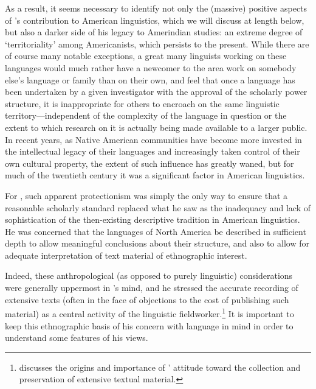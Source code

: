 As a result, it seems necessary to identify not only the (massive)
positive aspects of {\Boas}'s contribution to American linguistics, which
we will discuss at length below, but also a darker side of his legacy
to Amerindian studies: an extreme degree of `territoriality' among
Americanists, which persists to the pre\-sent. While there are of course
many notable exceptions, a great many linguists working on these
languages would much rather have a newcomer to the area work on
somebody else's language or family than on their own, and feel that
once a language has been undertaken by a given investigator with the
approval of the scholarly power structure, it is inappropriate for
others to encroach on the same linguistic territory—independent of the
complexity of the language in question or the extent to which research
on it is actually being made available to a larger public. In recent
years, as Native American communities have become more invested in the
intellectual legacy of their languages and increasingly taken control
of their own cultural property, the extent of such influence has
greatly waned, but for much of the twentieth century it was a
significant factor in American linguistics.

For {\Boas}, such apparent protectionism was simply the only way to
ensure that a reasonable scholarly standard replaced what he saw as
the inadequacy and lack of sophistication of the then-existing
descriptive tradition in American linguistics. He was concerned that
the languages of North America be described in sufficient depth to
allow meaningful conclusions about their structure, and also to allow
for adequate interpretation of text material of ethnographic interest.

Indeed, these anthropological (as opposed to purely linguistic)
considerations were generally uppermost in {\Boas}'s mind, and he
stressed the accurate recording of extensive texts (often in the face
of objections to the cost of publishing such material) as a central
activity of the linguistic
fieldworker.\footnote{\citet{silverstein15:boas} discusses the origins
  and importance of {\Boas}' attitude toward the collection and
  preservation of extensive textual material.} It is important to keep
this ethnographic basis of his concern with language in mind in order
to understand some features of his views.

